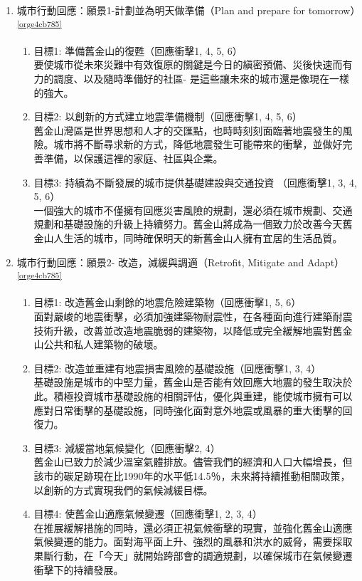 \documentclass[a4paper,12pt]{article}
\begin{document}
\begin{enumerate}
\begin{enumerate}
\item 城市行動回應：願景1-計劃並為明天做準備（Plan and prepare for tomorrow）\textsuperscript{\ref{orge4cb785}}
\label{sec:orgda3b7d2}
\begin{enumerate}
\item 目標1: 準備舊金山的復甦（回應衝擊1, 4, 5, 6）\\
要使城市從未來災難中有效復原的關鍵是今日的縝密預備、災後快速而有力的調度、以及隨時準備好的社區- 是這些讓未來的城市還是像現在一樣的強大。\\
\item 目標2: 以創新的方式建立地震準備機制（回應衝擊1, 4, 5, 6）\\
舊金山灣區是世界思想和人才的交匯點，也時時刻刻面臨著地震發生的風險。城市將不斷尋求新的方式，降低地震發生可能帶來的衝擊，並做好完善準備，以保護這裡的家庭、社區與企業。\\
\item 目標3: 持續為不斷發展的城市提供基礎建設與交通投資 （回應衝擊1, 3, 4, 5, 6）\\
一個強大的城市不僅擁有回應災害風險的規劃，還必須在城市規劃、交通規劃和基礎設施的升級上持續努力。舊金山將成為一個致力於改善今天舊金山人生活的城市，同時確保明天的新舊金山人擁有宜居的生活品質。\\
\end{enumerate}

\item 城市行動回應：願景2- 改造，減緩與調適（Retrofit, Mitigate and Adapt）\textsuperscript{\ref{orge4cb785}}
\label{sec:orgb43d814}
\begin{enumerate}
\item 目標1: 改造舊金山剩餘的地震危險建築物（回應衝擊1, 5, 6）\\
面對嚴峻的地震衝擊，必須加強建築物耐震性，在各種面向進行建築耐震技術升級，改善並改造地震脆弱的建築物，以降低或完全緩解地震對舊金山公共和私人建築物的破壞。\\
\item 目標2: 改造並重建有地震損害風險的基礎設施（回應衝擊1, 3, 4）\\
基礎設施是城市的中堅力量，舊金山是否能有效回應大地震的發生取決於此。積極投資城市基礎設施的相關評估，優化與重建，能使城市擁有可以應對日常衝擊的基礎設施，同時強化面對意外地震或風暴的重大衝擊的回復力。\\
\item 目標3: 減緩當地氣候變化（回應衝擊2, 4）\\
舊金山已致力於減少溫室氣體排放。儘管我們的經濟和人口大幅增長，但該市的碳足跡現在比1990年的水平低14.5％，未來將持續推動相關政策，以創新的方式實現我們的氣候減緩目標。\\
\item 目標4: 使舊金山適應氣候變遷（回應衝擊1, 2, 3, 4）\\
在推展緩解措施的同時，還必須正視氣候衝擊的現實，並強化舊金山適應氣候變遷的能力。面對海平面上升、強烈的風暴和洪水的威脅，需要採取果斷行動，在「今天」就開始跨部會的調適規劃，以確保城市在氣候變遷衝擊下的持續發展。\\
\end{enumerate}


\end{enumerate}
\end{enumerate}
\end{document}
